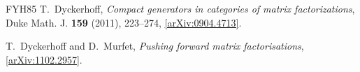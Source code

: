\documentclass{compositio}
\theoremstyle{definition}
\numberwithin{equation}{section}
\begin{document}
\begin{thebibliography}{FYH{\etalchar{+}}85}
%
%
%
%
%  
T.~Dyckerhoff, \emph{Compact generators in categories of matrix factorizations},
  Duke Math. J. \textbf{159} (2011), 223--274,
  \href{http://arxiv.org/abs/0904.4713}{[arXiv:0904.4713]}.

T.~Dyckerhoff and D.~Murfet, \emph{Pushing forward matrix factorisations},
  \href{http://arxiv.org/abs/1102.2957}{[arXiv:1102.2957]}.


\end{thebibliography}
\end{document}
